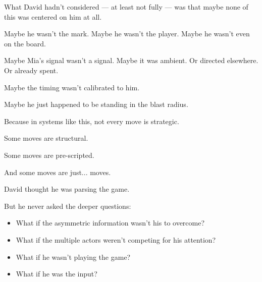 \medskip

What David hadn’t considered ---
at least not fully ---
was that maybe none of this was centered on him at all.

Maybe he wasn’t the mark.
Maybe he wasn’t the player.
Maybe he wasn’t even on the board.

Maybe Mia’s signal wasn’t a signal.
Maybe it was ambient.
Or directed elsewhere.
Or already spent.

Maybe the timing wasn’t calibrated to him.

Maybe he just happened to be standing in the blast radius.

Because in systems like this,
not every move is strategic.

Some moves are structural.

Some moves are pre-scripted.

And some moves are just... moves.

David thought he was parsing the game.

But he never asked the deeper questions:

\begin{itemize}
    \item What if the asymmetric information wasn't his to overcome?
    \item What if the multiple actors weren’t competing for his attention?
    \item What if he wasn’t playing the game?
    \item What if he was the input?
\end{itemize}

